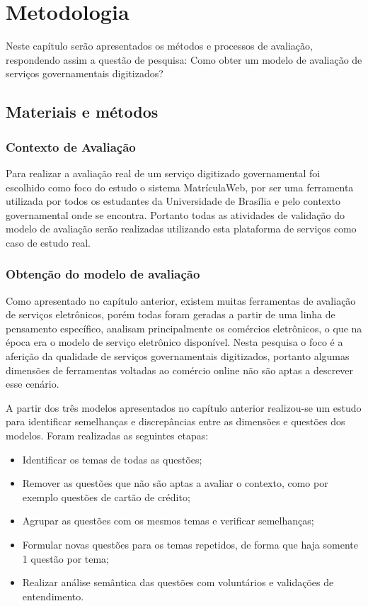 \chapter[Metodologia]{Metodologia}
Neste capítulo serão apresentados os métodos e processos de avaliação, respondendo assim a questão de pesquisa: Como obter um modelo de avaliação de serviços governamentais digitizados?

\section{Materiais e métodos}
	\subsection{Contexto de Avaliação}

	Para realizar a avaliação real de um serviço digitizado governamental foi escolhido como foco do estudo o sistema MatrículaWeb, por ser uma ferramenta utilizada por todos os estudantes da Universidade de Brasília e pelo contexto governamental onde se encontra. Portanto todas as atividades de validação do modelo de avaliação serão realizadas utilizando esta plataforma de serviços como caso de estudo real.

	\subsection{Obtenção do modelo de avaliação}

	Como apresentado no capítulo anterior, existem muitas ferramentas de avaliação de serviços eletrônicos, porém todas foram geradas a partir de uma linha de pensamento específico, analisam principalmente os comércios eletrônicos, o que na época era o modelo de serviço eletrônico disponível. Nesta pesquisa o foco é a aferição da qualidade de serviços governamentais digitizados, portanto algumas dimensões de ferramentas voltadas ao comércio online não são aptas a descrever esse cenário.

	A partir dos três modelos apresentados no capítulo anterior realizou-se um estudo para identificar semelhanças e discrepâncias entre as dimensões e questões dos modelos. Foram realizadas as seguintes etapas:

	\begin{itemize}
		\item Identificar os temas de todas as questões;
		\item Remover as questões que não são aptas a avaliar o contexto, como por exemplo questões de cartão de crédito;
		\item Agrupar as questões com os mesmos temas e verificar semelhanças;
		\item Formular novas questões para os temas repetidos, de forma que haja somente 1 questão por tema;
		\item Realizar análise semântica das questões com voluntários e validações de entendimento.
	\end{itemize}

